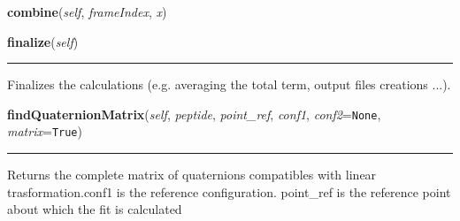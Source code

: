 \hspace{.8\funcindent}\begin{boxedminipage}{\funcwidth}

    \raggedright \textbf{combine}(\textit{self}, \textit{frameIndex}, \textit{x})

\setlength{\parskip}{2ex}
\setlength{\parskip}{1ex}
    \end{boxedminipage}

    \label{nMOLDYN:Analysis:Structure:ScrewFitAnalysis:finalize}

    \vspace{0.5ex}

\hspace{.8\funcindent}\begin{boxedminipage}{\funcwidth}

    \raggedright \textbf{finalize}(\textit{self})

    \vspace{-1.5ex}

    \rule{\textwidth}{0.5\fboxrule}
\setlength{\parskip}{2ex}
    Finalizes the calculations (e.g. averaging the total term, output files
    creations ...).

\setlength{\parskip}{1ex}
    \end{boxedminipage}

    \label{nMOLDYN:Analysis:Structure:ScrewFitAnalysis:findQuaternionMatrix}

    \vspace{0.5ex}

\hspace{.8\funcindent}\begin{boxedminipage}{\funcwidth}

    \raggedright \textbf{findQuaternionMatrix}(\textit{self}, \textit{peptide}, \textit{point\_ref}, \textit{conf1}, \textit{conf2}={\tt None}, \textit{matrix}={\tt True})

    \vspace{-1.5ex}

    \rule{\textwidth}{0.5\fboxrule}
\setlength{\parskip}{2ex}
    Returns the complete matrix of quaternions compatibles with linear 
    trasformation.{\textbar}conf1{\textbar} is the reference configuration.
    {\textbar}point\_ref{\textbar} is the reference point about which the 
    fit is calculated

\setlength{\parskip}{1ex}
    \end{boxedminipage}

